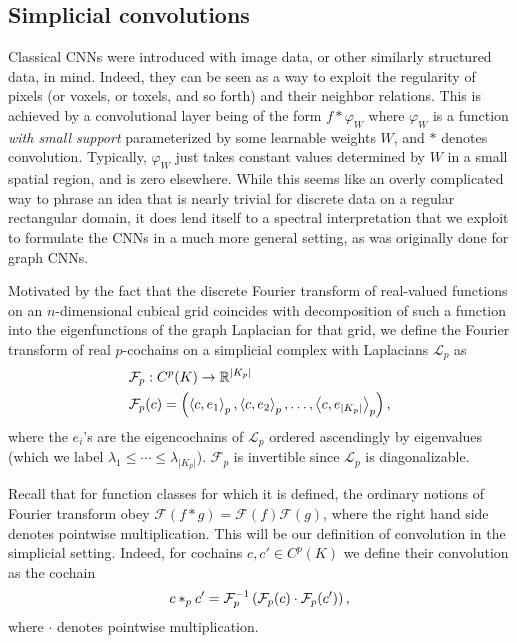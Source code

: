 \subsection{Simplicial convolutions}

Classical CNNs were introduced with image data, or other similarly structured data, in mind. Indeed, they can be seen as a way to exploit the regularity of pixels (or voxels, or toxels, and so forth) and their neighbor relations. This is achieved by a convolutional layer being of the form $f\ast \varphi_W$ where $\varphi_W$ is a function \emph{with small support} parameterized by some learnable weights $W$, and $\ast$ denotes convolution. Typically, $\varphi_W$ just takes constant values determined by $W$ in a small spatial region, and is zero elsewhere. While this seems like an overly complicated way to phrase an idea that is nearly trivial for discrete data on a regular rectangular domain, it does lend itself to a spectral interpretation that we exploit to formulate the CNNs in a much more general setting, as was originally done for graph CNNs.

Motivated by the fact that the discrete Fourier transform of real-valued functions on an $n$-dimensional cubical grid coincides with decomposition of such a function into the eigenfunctions of the graph Laplacian for that grid, we define the Fourier transform of real $p$-cochains on a simplicial complex with Laplacians $\mathcal{L}_p$ as
\begin{align*}
  &\mathcal{F}_p: C^p(K) \to \mathbb{R}^{\lvert K_p \rvert} \\
  &\mathcal{F}_p(c) = \left(\left\langle c , e_1 \right\rangle_p, \left\langle c , e_2 \right\rangle_p, \dotsc, \left\langle c , e_{\lvert K_p \rvert} \right\rangle_p\right),
\end{align*}
where the $e_i$'s are the eigencochains of $\mathcal{L}_p$ ordered ascendingly by eigenvalues (which we label $\lambda_1\leq\dotsm\leq\lambda_{\lvert K_p \rvert}$). $\mathcal{F}_p$ is invertible since $\mathcal{L}_p$ is diagonalizable.

Recall that for function classes for which it is defined, the ordinary notions of Fourier transform obey $\mathcal{F}(f\ast g)=\mathcal{F}(f)\mathcal{F}(g)$, where the right hand side denotes pointwise multiplication. This will be our definition of convolution in the simplicial setting. Indeed, for cochains $c,c'\in C^p(K)$ we define their convolution as the cochain
\begin{equation*}
  c\ast_p c' = \mathcal{F}_p^{-1}\left(\mathcal{F}_p(c)\cdot\mathcal{F}_p(c')\right),
\end{equation*}
where $\cdot$ denotes pointwise multiplication.

